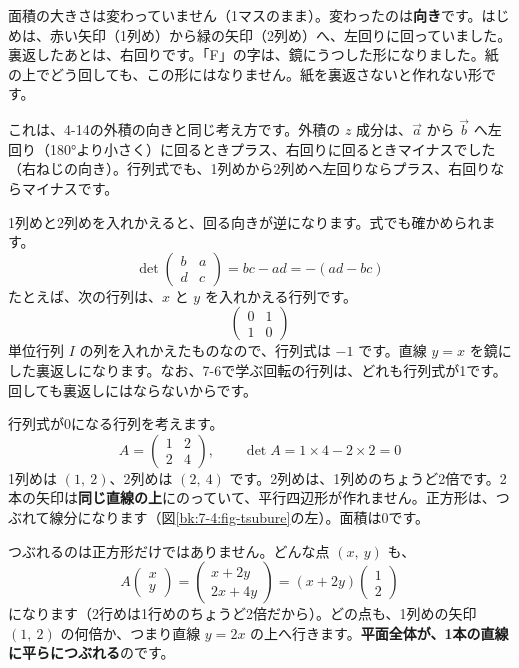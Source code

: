 \noindent 面積の大きさは変わっていません（1マスのまま）。変わったのは\textbf{向き}です。はじめは、赤い矢印（1列め）から緑の矢印（2列め）へ、左回りに回っていました。裏返したあとは、右回りです。「F」の字は、鏡にうつした形になりました。紙の上でどう回しても、この形にはなりません。紙を裏返さないと作れない形です。

\noindent これは、4-14の外積の向きと同じ考え方です。外積の $z$ 成分は、$\vec a$ から $\vec b$ へ左回り（180°より小さく）に回るときプラス、右回りに回るときマイナスでした（右ねじの向き）。行列式でも、1列めから2列めへ左回りならプラス、右回りならマイナスです。

1列めと2列めを入れかえると、回る向きが逆になります。式でも確かめられます。
\[ \det\begin{pmatrix}b&a\\d&c\end{pmatrix}=bc-ad=-(ad-bc) \]
たとえば、次の行列は、$x$ と $y$ を入れかえる行列です。
\[ \begin{pmatrix}0&1\\1&0\end{pmatrix} \]
単位行列 $I$ の列を入れかえたものなので、行列式は $-1$ です。直線 $y=x$ を鏡にした裏返しになります。なお、7-6で学ぶ回転の行列は、どれも行列式が1です。回しても裏返しにはならないからです。


\leavevmode\label{bk:7-4:zero}行列式が0になる行列を考えます。
\[ A=\begin{pmatrix}1&2\\2&4\end{pmatrix},\qquad \det A=1\times4-2\times2=0 \]
1列めは $(1,\ 2)$、2列めは $(2,\ 4)$ です。2列めは、1列めのちょうど2倍です。2本の矢印は\textbf{同じ直線の上}にのっていて、平行四辺形が作れません。正方形は、つぶれて線分になります（図\ref{bk:7-4:fig-tsubure}の左）。面積は0です。

\noindent つぶれるのは正方形だけではありません。どんな点 $(x,\ y)$ も、
\[ A\begin{pmatrix}x\\y\end{pmatrix}=\begin{pmatrix}x+2y\\2x+4y\end{pmatrix}=(x+2y)\begin{pmatrix}1\\2\end{pmatrix} \]
になります（2行めは1行めのちょうど2倍だから）。どの点も、1列めの矢印 $(1,\ 2)$ の何倍か、つまり直線 $y=2x$ の上へ行きます。\textbf{平面全体が、1本の直線に平らにつぶれる}のです。

